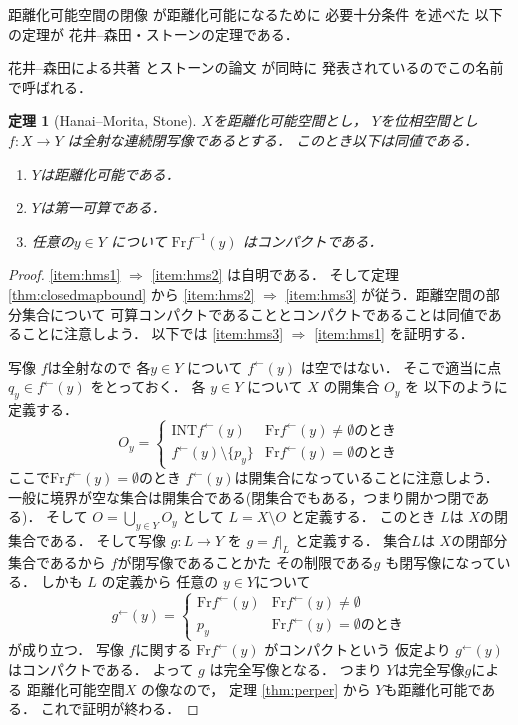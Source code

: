 \documentclass[leqno, a4paper, 12pt]{jsarticle}
\newtheorem{thm}{定理}
\newcommand{\To}{\Longrightarrow}
\newcommand{\nai}{\mathrm{INT}}
\newcommand{\bound}{\mathrm{Fr}}
\newcommand{\myinv}[1]{#1^{\gets}}
\begin{document}
距離化可能空間の閉像
が距離化可能になるために
必要十分条件
を述べた
以下の定理が
花井--森田・ストーンの定理である．

花井--森田による共著
\cite{MR0087077}
とストーンの論文
\cite{MR0087078}
が同時に
発表されているのでこの名前で呼ばれる．

\begin{thm}[Hanai--Morita, Stone]\label{thm:hms}
$X$を距離化可能空間とし，
$Y$を位相空間とし
$f\colon X\to Y$
は全射な連続閉写像であるとする．
このとき以下は同値である．
\begin{enumerate}[label=\textup{(\arabic*)}]
\item\label{item:hms1}
$Y$は距離化可能である．
\item\label{item:hms2}
$Y$は第一可算である．
\item\label{item:hms3}
任意の$y\in Y$
について
$\bound f^{-1}(y)$
はコンパクトである．
\end{enumerate}
\end{thm}
\begin{proof}
\ref{item:hms1} $\To$
\ref{item:hms2}
は自明である．
そして定理
\ref{thm:closedmapbound}
から
\ref{item:hms2}
$\To$
\ref{item:hms3}
が従う．距離空間の部分集合について
可算コンパクトであることとコンパクトであることは同値であることに注意しよう．
以下では
\ref{item:hms3}
$\To$
\ref{item:hms1}
を証明する．

写像
$f$は全射なので
各$y\in Y$
について
$\myinv{f}(y)$
は空ではない．
そこで適当に点
$q_{y}\in \myinv{f}(y)$
をとっておく．
各
$y\in Y$
について
$X$
の開集合
$O_{y}$
を
以下のように定義する．
\[
O_{y}
=
\begin{cases}
\nai \myinv{f}(y) & \text{$\bound \myinv{f}(y)\neq \emptyset$のとき}\\
\myinv{f}(y)\setminus \{p_{y}\} &
\text{$\bound \myinv{f}(y)=\emptyset$のとき}
\end{cases}
\]
ここで$\bound \myinv{f}(y)=\emptyset$のとき
$\myinv{f}(y)$は開集合になっていることに注意しよう．
一般に境界が空な集合は開集合である(閉集合でもある，つまり開かつ閉である)．
そして
$O=\bigcup_{y\in Y}O_{y}$
として
$L=X\setminus O$
と定義する．
このとき
$L$は
$X$の閉集合である．
そして写像
$g\colon L\to Y$
を
$g=f|_{L}$
と定義する．
集合$L$は
$X$の閉部分集合であるから
$f$が閉写像であることかた
その制限である$g$
も閉写像になっている．
しかも
$L$
の定義から
任意の
$y\in Y$について
\[
\myinv{g}(y)=
\begin{cases}
\bound \myinv{f}(y)& \text{$\bound \myinv{f}(y)\neq \emptyset$}\\
p_{y} &\text{$\bound \myinv{f}(y)=\emptyset$のとき}
\end{cases}
\]
が成り立つ．
写像
$f$に関する
$\bound \myinv{f}(y)$
がコンパクトという
仮定より
$\myinv{g}(y)$はコンパクトである．
よって
$g$
は完全写像となる．
つまり
$Y$は完全写像$g$による
距離化可能空間$X$
の像なので，
定理
\ref{thm:perper}
から
$Y$も距離化可能である．
これで証明が終わる．
\end{proof}
\end{document}

